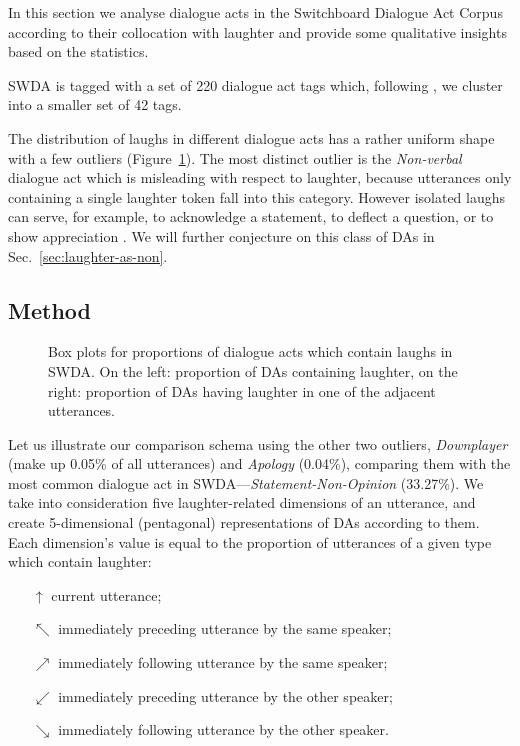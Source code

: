 \documentclass[11pt,a4paper]{article}
\begin{document}
In this section we analyse dialogue acts in the Switchboard Dialogue Act
Corpus according to their collocation with laughter and provide some
qualitative insights based on the statistics.

SWDA is tagged with a set of 220 dialogue act tags which, following
\citet{jurafskySwitchboardSWBDDAMSLShallowDiscourseFunction1997a}, we
cluster into a smaller set of 42 tags.

The distribution of laughs in different dialogue acts has a rather
uniform shape with a few outliers (Figure~\ref{fig:box-swda}). The
most distinct outlier is the \emph{Non-verbal} dialogue act which is
misleading with respect to laughter, because utterances only
containing a single laughter token fall into this category. However
isolated laughs can serve, for example, to acknowledge a statement, to
deflect a question, or to show appreciation
\citep{mazzocconi2019phd}. We will further conjecture on this class of
DAs in Sec.~\ref{sec:laughter-as-non}.

\subsection{Method}
\label{sec:method}

\begin{figure}
    \fontsize{8}{10}\selectfont
  
  \caption{Box plots for proportions of dialogue acts which contain laughs in SWDA. On the left: proportion of DAs containing laughter, on the right: proportion of DAs having laughter in one of the adjacent utterances.}%
  \label{fig:box-swda}
\end{figure}

Let us illustrate our comparison schema using the other two outliers,
\emph{Downplayer} (make up 0.05\% of all utterances) and \emph{Apology} (0.04\%), comparing them with the most common dialogue
act in SWDA---\emph{Statement-Non-Opinion} (33.27\%).  We take into consideration five
laughter-related dimensions of an utterance, and create 5-dimensional
(pentagonal) representations of DAs according to them. Each
dimension's value is equal to the proportion of utterances of a given
type which contain laughter:
\begin{itemize}
\item[$\uparrow$] current utterance;
\item[$\nwarrow$] immediately preceding utterance by the same speaker;
\item[$\nearrow$] immediately following utterance by the same speaker;
\item[$\swarrow$] immediately preceding utterance by the other speaker;
\item[$\searrow$] immediately following utterance by the other speaker.
\end{itemize}
\end{document}
